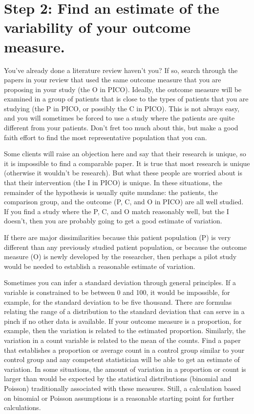 \documentclass[
  letterpaper,
  DIV=11,
  numbers=noendperiod]{scrreprt}
\begin{document}
\section{Step 2: Find an estimate of the variability of your outcome
measure.}\label{step-2-find-an-estimate-of-the-variability-of-your-outcome-measure.}

You've already done a literature review haven't you? If so, search
through the papers in your review that used the same outcome measure
that you are proposing in your study (the O in PICO). Ideally, the
outcome measure will be examined in a group of patients that is close to
the types of patients that you are studying (the P in PICO, or possibly
the C in PICO). This is not always easy, and you will sometimes be
forced to use a study where the patients are quite different from your
patients. Don't fret too much about this, but make a good faith effort
to find the most representative population that you can.

Some clients will raise an objection here and say that their research is
unique, so it is impossible to find a comparable paper. It is true that
most research is unique (otherwise it wouldn't be research). But what
these people are worried about is that their intervention (the I in
PICO) is unique. In these situations, the remainder of the hypothesis is
usually quite mundane: the patients, the comparison group, and the
outcome (P, C, and O in PICO) are all well studied. If you find a study
where the P, C, and O match reasonably well, but the I doesn't, then you
are probably going to get a good estimate of variation.

If there are major dissimilarities because this patient population (P)
is very different than any previously studied patient population, or
because the outcome measure (O) is newly developed by the researcher,
then perhaps a pilot study would be needed to establish a reasonable
estimate of variation.

Sometimes you can infer a standard deviation through general principles.
If a variable is constrained to be between 0 and 100, it would be
impossible, for example, for the standard deviation to be five thousand.
There are formulas relating the range of a distribution to the standard
deviation that can serve in a pinch if no other data is available. If
your outcome measure is a proportion, for example, then the variation is
related to the estimated proportion. Similarly, the variation in a count
variable is related to the mean of the counts. Find a paper that
establishes a proportion or average count in a control group similar to
your control group and any competent statistician will be able to get an
estimate of variation. In some situations, the amount of variation in a
proportion or count is larger than would be expected by the statistical
distributions (binomial and Poisson) traditionally associated with these
measures. Still, a calculation based on binomial or Poisson assumptions
is a reasonable starting point for further calculations.
\end{document}
